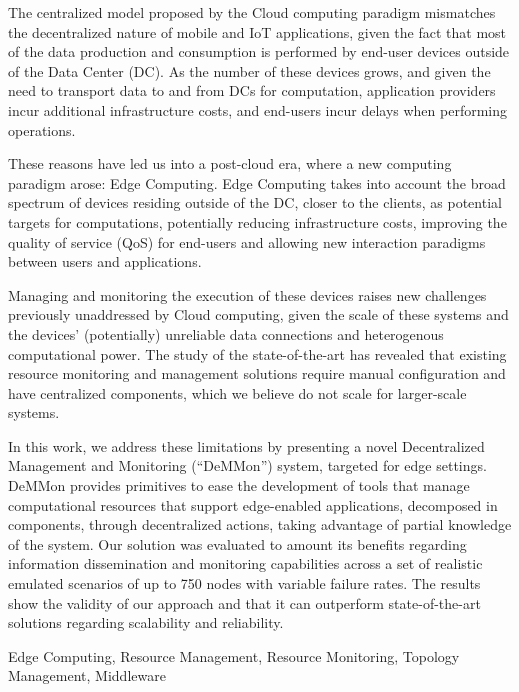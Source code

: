 

The centralized model proposed by the Cloud computing paradigm mismatches the decentralized nature of mobile and IoT applications, given the fact that most of the data production and consumption is performed by end-user devices outside of the Data Center (DC). As the number of these devices grows, and given the need to transport data to and from DCs for computation, application providers incur additional infrastructure costs, and end-users incur delays when performing operations. 

These reasons have led us into a post-cloud era, where a new computing paradigm arose: Edge Computing. Edge Computing takes into account the broad spectrum of devices residing outside of the DC, closer to the clients, as potential 
targets for computations, potentially reducing infrastructure costs, improving the quality of service (QoS) for end-users and allowing new interaction paradigms between users and applications. 

Managing and monitoring the execution of these devices raises new challenges previously unaddressed by Cloud computing, given the scale of these systems and the devices' (potentially) unreliable data connections and heterogenous computational power. The study of the state-of-the-art has revealed that existing resource monitoring and management solutions require manual configuration and have centralized components, which we believe do not scale for larger-scale systems. 

In this work, we address these limitations by presenting a novel Decentralized Management and Monitoring (``DeMMon'') system, targeted for edge settings. DeMMon provides primitives to ease the development of tools that manage computational resources that support edge-enabled applications, decomposed in components, through decentralized actions, taking advantage of partial knowledge of the system. Our solution was evaluated to amount its benefits regarding information dissemination and monitoring capabilities across a set of realistic emulated scenarios of up to 750 nodes with variable failure rates. The results show the validity of our approach and that it can outperform state-of-the-art solutions regarding scalability and reliability. 


\begin{keywords}
  Edge Computing, Resource Management, Resource Monitoring, Topology Management, Middleware
\end{keywords} 
